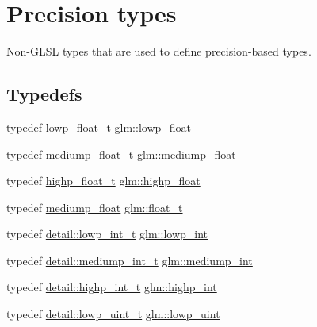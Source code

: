 \hypertarget{group__core__precision}{}\section{Precision types}
\label{group__core__precision}


Non-\/\+G\+L\+SL types that are used to define precision-\/based types.  


\subsection*{Typedefs}
\begin{DoxyCompactItemize}
\item 
typedef \mbox{\hyperlink{namespaceglm_a0a43b64238afac063f27ee7620205bf2}{lowp\+\_\+float\+\_\+t}} \mbox{\hyperlink{group__core__precision_ga2887fbc729ac5c1c5caeb7cd57a7145c}{glm\+::lowp\+\_\+float}}
\item 
typedef \mbox{\hyperlink{namespaceglm_aec127979a2b6edbf05b485cb4e8c47cc}{mediump\+\_\+float\+\_\+t}} \mbox{\hyperlink{group__core__precision_gac785826c039fe6c97c03b37c81c1a68e}{glm\+::mediump\+\_\+float}}
\item 
typedef \mbox{\hyperlink{namespaceglm_af6f4e45ae06ae3f979dd30cafe7d07c6}{highp\+\_\+float\+\_\+t}} \mbox{\hyperlink{group__core__precision_ga3d443a093adc053638ed7f81c5bfe300}{glm\+::highp\+\_\+float}}
\item 
typedef \mbox{\hyperlink{group__core__precision_gac785826c039fe6c97c03b37c81c1a68e}{mediump\+\_\+float}} \mbox{\hyperlink{group__core__precision_gae01b87f81bd15327230bf1b47c482b24}{glm\+::float\+\_\+t}}
\item 
typedef \mbox{\hyperlink{namespaceglm_1_1detail_a030a8128e369fc1f9c7982dc68a78ba7}{detail\+::lowp\+\_\+int\+\_\+t}} \mbox{\hyperlink{group__core__precision_ga4681244bf4a184734f03aa9df4e3d288}{glm\+::lowp\+\_\+int}}
\item 
typedef \mbox{\hyperlink{namespaceglm_1_1detail_aede0757f19204d1d44f716b3dd66d13c}{detail\+::mediump\+\_\+int\+\_\+t}} \mbox{\hyperlink{group__core__precision_ga2a3dcbcd7f4e17663d393a12061ac6ac}{glm\+::mediump\+\_\+int}}
\item 
typedef \mbox{\hyperlink{namespaceglm_1_1detail_a74c48e9deafcc33db998a4ee62da8d6e}{detail\+::highp\+\_\+int\+\_\+t}} \mbox{\hyperlink{group__core__precision_gaafed5240eb0a43328cb75faf5fb0a8c2}{glm\+::highp\+\_\+int}}
\item 
typedef \mbox{\hyperlink{namespaceglm_1_1detail_ad59c4581ad8ce0c3ef6146edaa7e15dc}{detail\+::lowp\+\_\+uint\+\_\+t}} \mbox{\hyperlink{group__core__precision_ga8077c90f2c87e419ea6c273157dcc1fc}{glm\+::lowp\+\_\+uint}}

\end{DoxyCompactItemize}
